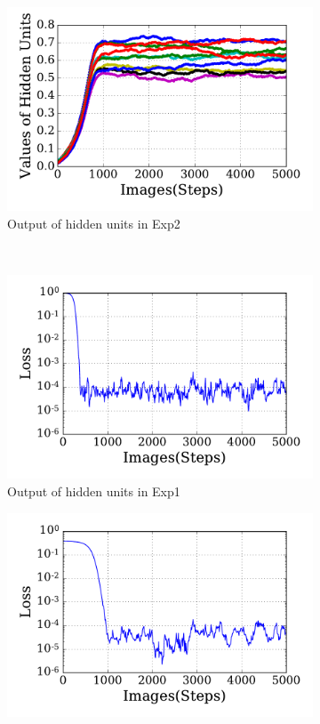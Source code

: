 \begin{figure}
\begin{subfigure}[t]{0.48\textwidth}
		\includegraphics[width=\textwidth]{pics_sdlm/30_exp_RBM/exp2_hid_non.pdf}
		\caption{Output of hidden units in Exp2}
	\end{subfigure}\\
	\begin{subfigure}[t]{0.48\textwidth}
		\includegraphics[width=\textwidth]{pics_sdlm/30_exp_RBM/exp1_loss.pdf}
		\caption{Output of hidden units in Exp1}
	\end{subfigure}
	\begin{subfigure}[t]{0.48\textwidth}
		\includegraphics[width=\textwidth]{pics_sdlm/30_exp_RBM/exp2_loss.pdf}

\end{subfigure}
\end{figure}
